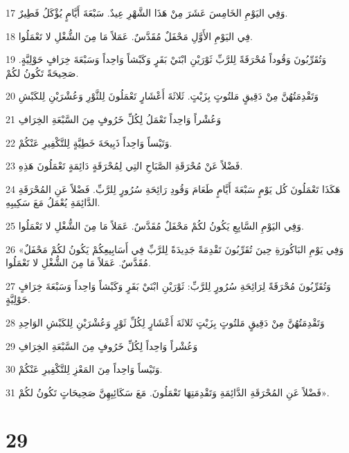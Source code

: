 \par 17 وَفِي اليَوْمِ الخَامِسَ عَشَرَ مِنْ هَذَا الشَّهْرِ عِيدٌ. سَبْعَةَ أَيَّامٍ يُؤْكَلُ فَطِيرٌ.
\par 18 فِي اليَوْمِ الأَوَّلِ مَحْفَلٌ مُقَدَّسٌ. عَمَلاً مَا مِنَ الشُّغْلِ لا تَعْمَلُوا.
\par 19 وَتُقَرِّبُونَ وَقُوداً مُحْرَقَةً لِلرَّبِّ ثَوْرَيْنِ ابْنَيْ بَقَرٍ وَكَبْشاً وَاحِداً وَسَبْعَةَ خِرَافٍ حَوْلِيَّةٍ. صَحِيحَةً تَكُونُ لكُمْ.
\par 20 وَتَقْدِمَتُهُنَّ مِنْ دَقِيقٍ مَلتُوتٍ بِزَيْتٍ. ثَلاثَةَ أَعْشَارٍ تَعْمَلُونَ لِلثَّوْرِ وَعُشْرَيْنِ لِلكَبْشِ
\par 21 وَعُشْراً وَاحِداً تَعْمَلُ لِكُلِّ خَرُوفٍ مِنَ السَّبْعَةِ الخِرَافِ
\par 22 وَتَيْساً وَاحِداً ذَبِيحَةَ خَطِيَّةٍ لِلتَّكْفِيرِ عَنْكُمْ.
\par 23 فَضْلاً عَنْ مُحْرَقَةِ الصَّبَاحِ التِي لِمُحْرَقَةٍ دَائِمَةٍ تَعْمَلُونَ هَذِهِ.
\par 24 هَكَذَا تَعْمَلُونَ كُل يَوْمٍ سَبْعَةَ أَيَّامٍ طَعَامَ وَقُودِ رَائِحَةِ سُرُورٍ لِلرَّبِّ. فَضْلاً عَنِ المُحْرَقَةِ الدَّائِمَةِ يُعْمَلُ مَعَ سَكِيبِهِ.
\par 25 وَفِي اليَوْمِ السَّابِعِ يَكُونُ لكُمْ مَحْفَلٌ مُقَدَّسٌ. عَمَلاً مَا مِنَ الشُّغْلِ لا تَعْمَلُوا.
\par 26 «وَفِي يَوْمِ البَاكُورَةِ حِينَ تُقَرِّبُونَ تَقْدِمَةً جَدِيدَةً لِلرَّبِّ فِي أَسَابِيعِكُمْ يَكُونُ لكُمْ مَحْفَلٌ مُقَدَّسٌ. عَمَلاً مَا مِنَ الشُّغْلِ لا تَعْمَلُوا.
\par 27 وَتُقَرِّبُونَ مُحْرَقَةً لِرَائِحَةِ سُرُورٍ لِلرَّبِّ: ثَوْرَيْنِ ابْنَيْ بَقَرٍ وَكَبْشاً وَاحِداً وَسَبْعَةَ خِرَافٍ حَوْلِيَّةٍ.
\par 28 وَتَقْدِمَتُهُنَّ مِنْ دَقِيقٍ مَلتُوتٍ بِزَيْتٍ ثَلاثَةَ أَعْشَارٍ لِكُلِّ ثَوْرٍ وَعُشْرَيْنِ لِلكَبْشِ الوَاحِدِ
\par 29 وَعُشْراً وَاحِداً لِكُلِّ خَرُوفٍ مِنَ السَّبْعَةِ الخِرَافِ
\par 30 وَتَيْساً وَاحِداً مِنَ المَعْزِ لِلتَّكْفِيرِ عَنْكُمْ.
\par 31 فَضْلاً عَنِ المُحْرَقَةِ الدَّائِمَةِ وَتَقْدِمَتِهَا تَعْمَلُونَ. مَعَ سَكَائِبِهِنَّ صَحِيحَاتٍ تَكُونُ لكُمْ».

\chapter{29}

